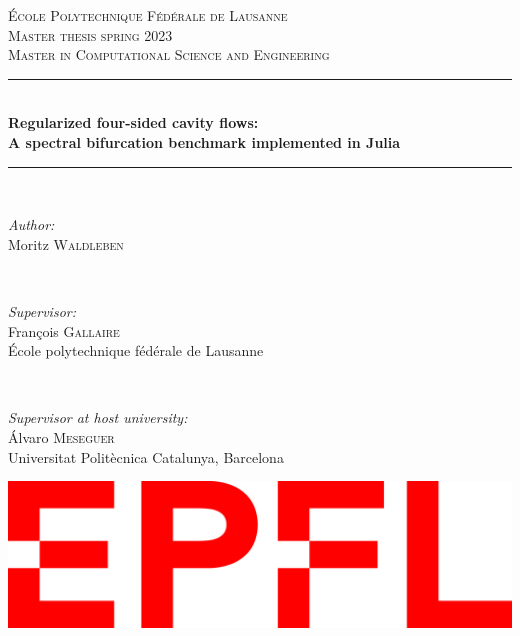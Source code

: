 \begin{titlepage}
\newcommand{\HRule}{\rule{\linewidth}{0.5mm}}

\center
 

\vspace{3cm}
\textsc{\LARGE École Polytechnique Fédérale de Lausanne}\\[1.5cm]
\textsc{\Large Master thesis spring 2023}\\[0.5cm]
\textsc{\large Master in Computational Science and Engineering}\\[0.5cm]


\HRule \\[0.4cm]
{ \huge \bfseries  Regularized four-sided cavity flows:\\ A spectral
  bifurcation benchmark implemented in Julia}\\[0.4cm]
\HRule \\[1.5cm]
 

\begin{flushleft} \large
\emph{Author:} \\
Moritz \textsc{Waldleben}
\end{flushleft}
~
\begin{flushleft} \large
\emph{Supervisor:} \\ 
François \textsc{Gallaire} \\
École polytechnique fédérale de Lausanne
\end{flushleft}
~
\begin{flushleft} \large
\emph{Supervisor at host university:} \\
Álvaro \textsc{Meseguer} \\
Universitat Politècnica Catalunya, Barcelona
\end{flushleft}

\vspace{7cm}


\begin{center}
\includegraphics[width=0.3\linewidth]{figs/logo_epfl}\\[1cm]
\end{center}
 

\vfill

\end{titlepage}
